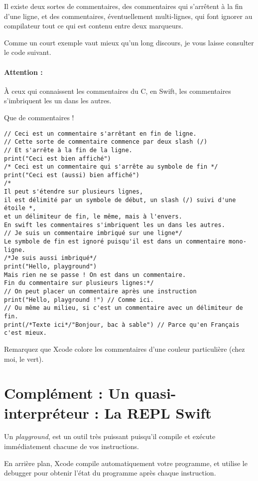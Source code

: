 Il existe deux sortes de commentaires,
des commentaires qui s'arrêtent à la fin d'une ligne,
et des commentaires, éventuellement multi-lignes,
qui font ignorer au compilateur tout ce qui est contenu entre deux marqueurs.

Comme un court exemple vaut mieux qu’un long discours,
je vous laisse consulter le code suivant.

\paragraph{Attention :} À ceux qui connaissent les commentaires du C,
en Swift, les commentaires s'imbriquent les un dans les autres.

\begin{listing}[H]
\caption{Que de commentaires !}
\begin{verbatim}
// Ceci est un commentaire s'arrêtant en fin de ligne.
// Cette sorte de commentaire commence par deux slash (/)
// Et s'arrête à la fin de la ligne.
print("Ceci est bien affiché")
/* Ceci est un commentaire qui s'arrête au symbole de fin */
print("Ceci est (aussi) bien affiché")
/*
Il peut s'étendre sur plusieurs lignes,
il est délimité par un symbole de début, un slash (/) suivi d'une étoile *,
et un délimiteur de fin, le même, mais à l'envers.
En swift les commentaires s'imbriquent les un dans les autres.
// Je suis un commentaire imbriqué sur une ligne*/
Le symbole de fin est ignoré puisqu'il est dans un commentaire mono-ligne.
/*Je suis aussi imbriqué*/
print("Hello, playground")
Mais rien ne se passe ! On est dans un commentaire.
Fin du commentaire sur plusieurs lignes:*/
// On peut placer un commentaire après une instruction
print("Hello, playground !") // Comme ici.
// Ou même au milieu, si c'est un commentaire avec un délimiteur de fin.
print(/*Texte ici*/"Bonjour, bac à sable") // Parce qu'en Français c'est mieux.
\end{verbatim}
\end{listing}
Remarquez que Xcode colore les commentaires d'une couleur particulière (chez moi, le vert).

\section{Complément : Un quasi-interpréteur : La REPL Swift}
Un \emph{playground}, est un outil très puissant
puisqu’il compile et exécute immédiatement
chacune de vos instructions.

En arrière plan, Xcode compile automatiquement votre programme,
et utilise le debugger pour obtenir l’état du programme après chaque instruction.


